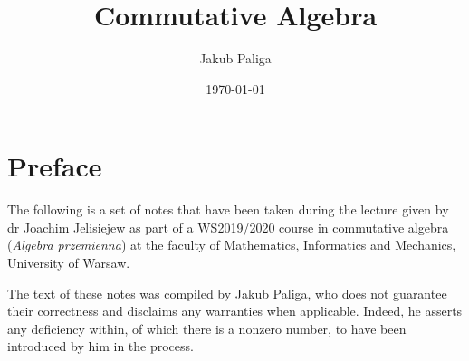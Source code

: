 \author{Jakub Paliga}
\subject{Lecture notes for}
\title{Commutative Algebra}
\date{\today}

\maketitle

\section{Preface}
The following is a set of notes that have been taken during the lecture given by dr Joachim Jelisiejew as part of a WS2019/2020 course in commutative algebra (\textit{Algebra przemienna}) at the faculty of Mathematics, Informatics and Mechanics, University of Warsaw.

The text of these notes was compiled by Jakub Paliga, who does not guarantee their correctness and disclaims any warranties when applicable. Indeed, he asserts any deficiency within, of which there is a nonzero number, to have been introduced by him in the process.



